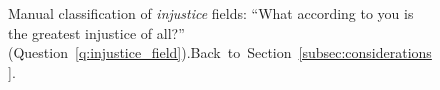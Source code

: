 \begin{figure}[h!]
    \caption[Manual classification of \textit{injustice} fields]{Manual classification of \textit{injustice} fields: ``What according to you is the greatest injustice of all?'' (Question~\ref{q:injustice_field}).\hfill Back~to~Section~\ref{subsec:considerations}.
    }\label{fig:injustice_field}
\end{figure}

